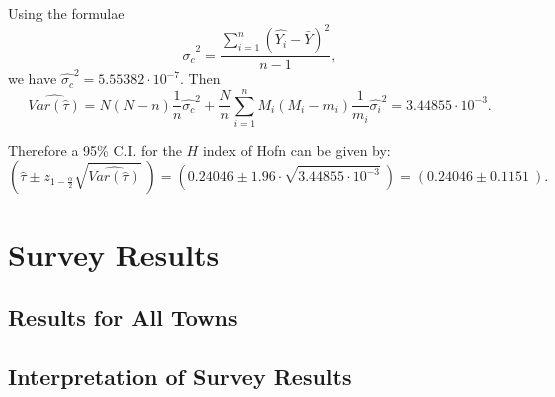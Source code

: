 \documentclass[12pt]{article}%
\begin{document}
Using the formulae 
$$\hat{\sigma_c}^2=\frac{ \sum_{i=1}^n (\hat{Y_i} - \bar{Y})^2 }{n-1},$$
we have $\hat{\sigma_c}^2 = 5.55382\cdot 10^{-7}.$ Then 
$$\widehat{Var(\hat{\tau})} 
= N(N-n)\frac{1}{n}\hat{\sigma_c}^2
+\frac{N}{n}\sum_{i=1}^{n}M_i(M_i-m_i)\frac{1}{m_i}\hat{\sigma_i}^2
=3.44855\cdot 10^{-3}.$$

Therefore a 95\% C.I. for the $H$ index of Hofn can be given by: 
$$(\hat{\tau} \pm z_{1-\frac{\alpha}{2}}\sqrt{\widehat{Var(\hat{\tau})}}~)
=(0.24046 \pm 1.96\cdot \sqrt{3.44855\cdot 10^{-3}}~)
=(0.24046 \pm 0.1151~).$$

\section{Survey Results}
\subsection{Results for All Towns}
\subsection{Interpretation of Survey Results}
\end{document}
